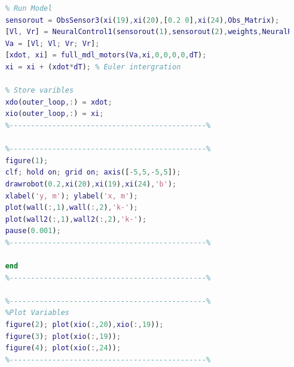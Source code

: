\documentclass{l4proj}
\begin{document}
\begin{lstlisting}[language=Matlab, float, caption={Code implementing Neural controller}, label=lst:callahan]
    %----------------------------------------------%
    % Run Model
    sensorout = ObsSensor3(xi(19),xi(20),[0.2 0],xi(24),Obs_Matrix);
    [Vl, Vr] = NeuralControl1(sensorout(1),sensorout(2),weights,NeuralPara);
    Va = [Vl; Vl; Vr; Vr];
    [xdot, xi] = full_mdl_motors(Va,xi,0,0,0,0,dT);   
    xi = xi + (xdot*dT); % Euler intergration
    
    % Store varibles
    xdo(outer_loop,:) = xdot;
    xio(outer_loop,:) = xi;
    %----------------------------------------------%
    
    %----------------------------------------------%
    figure(1);
    clf; hold on; grid on; axis([-5,5,-5,5]);
    drawrobot(0.2,xi(20),xi(19),xi(24),'b');
    xlabel('y, m'); ylabel('x, m');
    plot(wall(:,1),wall(:,2),'k-');
    plot(wall2(:,1),wall2(:,2),'k-');
    pause(0.001);
    %----------------------------------------------%
    
    end
    %----------------------------------------------%
    
    %----------------------------------------------%
    %Plot Variables
    figure(2); plot(xio(:,20),xio(:,19));
    figure(3); plot(xio(:,19));
    figure(4); plot(xio(:,24));
    %----------------------------------------------%

    \end{lstlisting}
    
\end{document}
